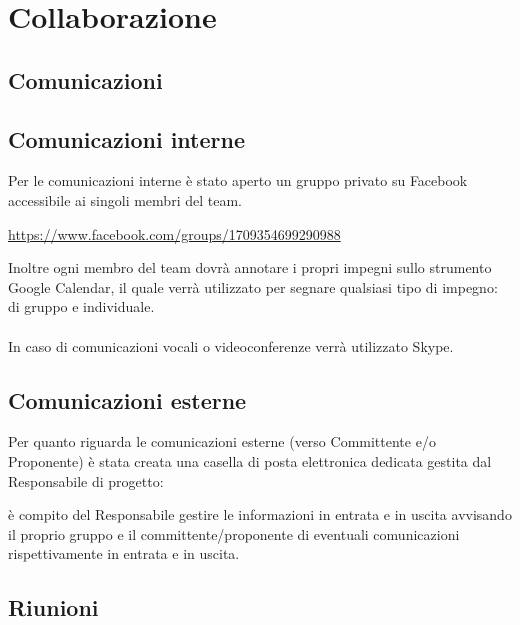 \section{Collaborazione}{
\subsection{Comunicazioni}
	\subsection{Comunicazioni interne}{
		Per le comunicazioni interne \`{e} stato aperto un gruppo privato su Facebook accessibile ai singoli membri del team. \begin{center}
			\url{https://www.facebook.com/groups/1709354699290988}
		\end{center} 
		Inoltre ogni membro del team dovr\`{a} annotare i propri impegni sullo strumento Google Calendar, il quale verr\`{a} utilizzato per segnare qualsiasi tipo di impegno: di gruppo e individuale.\\\\
		In caso di comunicazioni vocali o videoconferenze verrà utilizzato Skype.
		
	 }
	\subsection{Comunicazioni esterne}{
	Per quanto riguarda le comunicazioni esterne (verso Committente e/o Proponente) \`{e} stata creata una casella di posta elettronica dedicata gestita dal Responsabile di progetto: \begin{center}
		\href{mailto:\mail}{\mail} \end{center} \`{e} compito del Responsabile gestire le informazioni in entrata e in uscita avvisando il proprio gruppo e il committente/proponente di eventuali comunicazioni rispettivamente in entrata e in uscita.
		}
}

\subsection{Riunioni}
